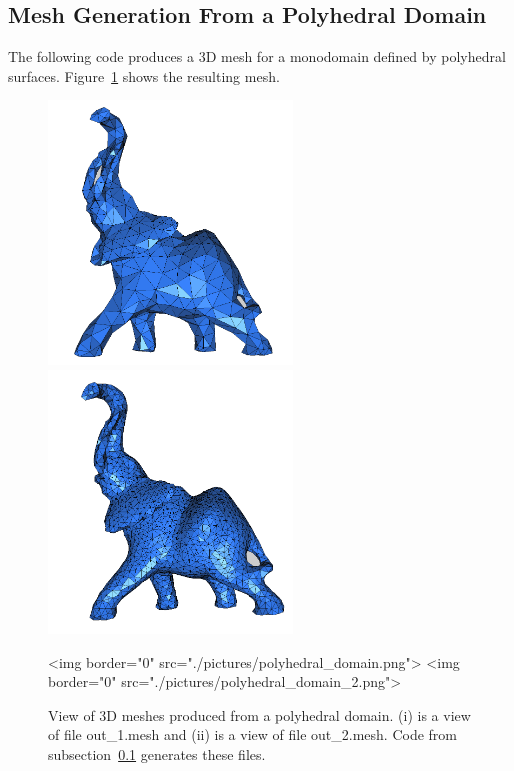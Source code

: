 \subsection{Mesh Generation From a Polyhedral Domain}
\label{Mesh_3_subsection_examples_polyhedral}
The following code produces a 3D mesh for a monodomain
defined by polyhedral surfaces. Figure~\ref{figure:polyhedral_domain}
shows the resulting mesh.


\begin{figure}[ht]
\begin{center}
 \begin{ccTexOnly}
   \includegraphics[height=7cm]{Mesh_3/pictures/polyhedral_domain}
   \includegraphics[height=7cm]{Mesh_3/pictures/polyhedral_domain_2}
 \end{ccTexOnly}
 \begin{ccHtmlOnly}
   <img border="0" src="./pictures/polyhedral_domain.png">
   <img border="0" src="./pictures/polyhedral_domain_2.png">
 \end{ccHtmlOnly}
 \caption{View of 3D meshes produced from a polyhedral domain. (i) 
   is a view of file out\_1.mesh and (ii) is a view of file
   out\_2.mesh. Code from
   subsection~\ref{Mesh_3_subsection_examples_polyhedral} generates
   these files.}
  \label{figure:polyhedral_domain}
\end{center}
\end{figure}


